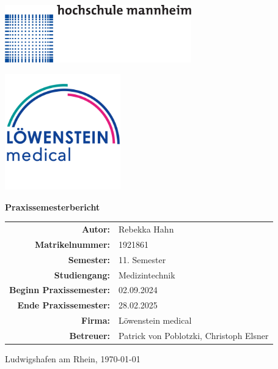 \documentclass[a4paper, 12pt]{article}
\begin{document}
\begin{titlepage}
	\centering

    \begin{minipage}{0.1\textwidth}
        \includegraphics[height=2.5cm]
        {Hochschule_Mannheim_logo.png}
    \end{minipage}
    \hfill 
    \begin{minipage}{0.33\textwidth}
        \includegraphics[height=5cm]
        {loewenstein_logo.png}
    \end{minipage}	

    \vspace{2.5cm} %
	
	{\Huge\bfseries Praxissemesterbericht \par}
    \vspace{2cm} %

    \begin{tabular}{ r  l }
        \textbf{Autor:} & Rebekka Hahn \\
        \textbf{Matrikelnummer:} & 1921861 \\
        \textbf{Semester:} & 11. Semester \\
        \textbf{Studiengang:} & Medizintechnik \\
        \textbf{Beginn Praxissemester:} & 02.09.2024 \\
        \textbf{Ende Praxissemester:} & 28.02.2025 \\
        \textbf{Firma:} & Löwenstein medical \\
        \textbf{Betreuer:} & Patrick von Poblotzki, Christoph Elsner \\
    \end{tabular}
    
    \vfill %

    {\large Ludwigshafen am Rhein, \today \par}

\end{titlepage}
\end{document}
